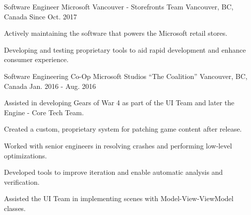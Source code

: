 

\begin{cventries}

  \cventry
    {Software Engineer} %
    {Microsoft Vancouver - Storefronts Team} %
    {Vancouver, BC, Canada} %
    {Since Oct. 2017} %
    {
      \begin{cvitems} %
	\item {Actively maintaining the software that powers the Microsoft retail stores.}
        \item {Developing and testing proprietary tools to aid rapid development and enhance consumer experience.}
        \\
      \end{cvitems}
    }

  \cventry
    {Software Engineering Co-Op} %
    {Microsoft Studios ``The Coalition''} %
    {Vancouver, BC, Canada} %
    {Jan. 2016 - Aug. 2016} %
    {
      \begin{cvitems} %
        \item {Assisted in developing Gears of War 4 as part of the UI Team and later the Engine - Core Tech Team.}
        \item {Created a custom, proprietary system for patching game content after release.}
        \item {Worked with senior engineers in resolving crashes and performing low-level optimizations.}
        \item {Developed tools to improve iteration and enable automatic analysis and verification.}
        \item {Assisted the UI Team in implementing scenes with Model-View-ViewModel classes.}
        \\
      \end{cvitems}
    }


\end{cventries}
